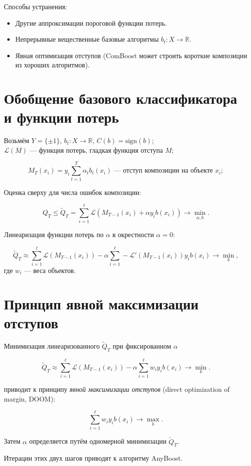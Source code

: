 Способы устранения:
\begin{itemize}
    \item Другие аппроксимации пороговой функции потерь.
    \item Непрерывные вещественные базовые алгоритмы $b_t: X \to \mathbb{R}$.
    \item Явная оптимизация отступов (ComBoost может строить короткие композиции из хороших алгоритмов).
\end{itemize}

\section*{Обобщение базового классификатора и функции потерь}

Возьмём $Y = \{\pm 1\}$, $b_t : X \to \mathbb{R}$, $C(b) = \text{sign}(b)$;\\
$\mathcal{L}(M)$ — функция потерь, гладкая функция отступа $M$;

\[
M_T(x_i) = y_i \sum_{t=1}^{T} \alpha_t b_t(x_i) \text{ — отступ композиции на объекте } x_i;
\]

Оценка сверху для числа ошибок композиции:

\[
Q_T \leq \tilde{Q}_T = \sum_{i=1}^{\ell} \mathcal{L}(M_{T-1}(x_i) + \alpha y_i b(x_i)) \to \min_{\alpha, b}.
\]

Линеаризация функции потерь по $\alpha$ в окрестности $\alpha = 0$:

\[
\tilde{Q}_T \approx \sum_{i=1}^{\ell} \mathcal{L}(M_{T-1}(x_i)) - \alpha \sum_{i=1}^{\ell} -\mathcal{L}'(M_{T-1}(x_i)) y_i b(x_i) \to \min_{b},
\]
где $w_i$ — веса объектов.

\section*{Принцип явной максимизации отступов}

Минимизация линеаризованного $\tilde{Q}_T$ при фиксированном $\alpha$

\[
\tilde{Q}_T \approx \sum_{i=1}^{\ell} \mathcal{L}(M_{T-1}(x_i)) - \alpha \sum_{i=1}^{\ell} w_i y_i b(x_i) \to \min_{b}.
\]

приводит к принципу \textit{явной максимизации отступов} (direct optimization of margin, DOOM):

\[
\sum_{i=1}^{\ell} w_i y_i b(x_i) \to \max_{b}.
\]

Затем $\alpha$ определяется путём одномерной минимизации $\tilde{Q}_T$.

Итерации этих двух шагов приводят к алгоритму AnyBoost.

